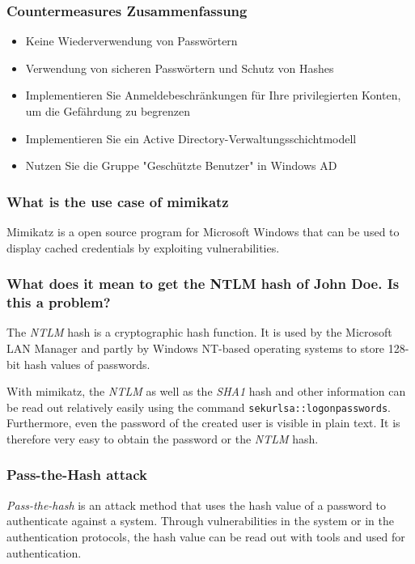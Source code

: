 \subsubsection{Countermeasures Zusammenfassung}
\begin{itemize}
    \item Keine Wiederverwendung von Passwörtern
    \item Verwendung von sicheren Passwörtern und Schutz von Hashes
    \item Implementieren Sie Anmeldebeschränkungen für Ihre privilegierten Konten, um die Gefährdung zu begrenzen
    \item Implementieren Sie ein Active Directory-Verwaltungsschichtmodell
    \item Nutzen Sie die Gruppe "Geschützte Benutzer" in Windows AD
\end{itemize}

\subsubsection{What is the use case of mimikatz}
Mimikatz is a open source program for Microsoft Windows that can be used to display cached credentials by exploiting vulnerabilities.

\subsubsection{What does it mean to get the NTLM hash of John Doe. Is this a problem?}
The \textit{NTLM} hash is a cryptographic hash function. It is used by the Microsoft LAN Manager and partly by Windows NT-based operating systems to store 128-bit hash values of passwords.

With mimikatz, the \textit{NTLM} as well as the \textit{SHA1} hash and other information can be read out relatively easily using the command \lstinline|sekurlsa::logonpasswords|. Furthermore, even the password of the created user is visible in plain text.
It is therefore very easy to obtain the password or the \textit{NTLM} hash.

\subsubsection{Pass-the-Hash attack}
\textit{Pass-the-hash} is an attack method that uses the hash value of a password to authenticate against a system. Through vulnerabilities in the system or in the authentication protocols, the hash value can be read out with tools and used for authentication.

